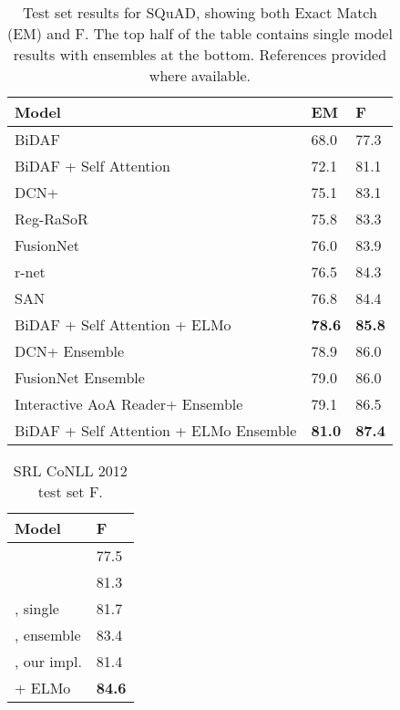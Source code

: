 \documentclass[11pt,a4paper]{article}
\newcommand{\ELMO}{ELMo}
\begin{document}
\begin{table*}
\centering
\begin{tabular}{l|l|l}
\textbf{Model}                         & \textbf{EM}       & \textbf{F} \\ \hline \hline
BiDAF \citep{Seo2016BidirectionalAF}  & 68.0	& 77.3 \\
BiDAF + Self Attention  & 72.1	 & 81.1 \\
DCN+ & 75.1 &	83.1 \\
Reg-RaSoR  & 75.8 &	83.3 \\
FusionNet  & 76.0	 & 83.9 \\
r-net \citep{Wang2017GatedSN} & 76.5 &	84.3 \\
SAN \citep{liu2017stochastic} & 76.8 & 84.4 \\
BiDAF + Self Attention + \ELMO{} & \textbf{78.6}  & \textbf{85.8} \\ \hline
DCN+ Ensemble & 78.9 & 86.0 \\
FusionNet Ensemble & 79.0 & 86.0 \\
Interactive AoA Reader+ Ensemble & 79.1 & 86.5 \\
BiDAF + Self Attention + \ELMO{} Ensemble & \textbf{81.0}  & \textbf{87.4}

\end{tabular}
\caption{Test set results for SQuAD, showing both Exact Match (EM) and F.  The top half of the table contains single model results with ensembles at the bottom.
References provided where available.
}
\label{table:squad_test}
\end{table*}


\begin{table}
\centering
\begin{tabular}{l|l}
\textbf{Model}                                & \textbf{F} \\ \hline \hline
\citet{Pradhan2013TowardsRL}   & 77.5 \\
\citet{Zhou2015EndtoendLO}                & 81.3     \\
\citet{He2017DeepSR}, single                  & 81.7      \\
\citet{He2017DeepSR}, ensemble     & 83.4  \\ \hline
\citet{He2017DeepSR}, our impl. & 81.4         \\
\citet{He2017DeepSR} + \ELMO             & \textbf{84.6}       \\
\end{tabular}
\caption{SRL CoNLL 2012 test set F.
}
\label{table:srl_test}
\end{table}
\end{document}
